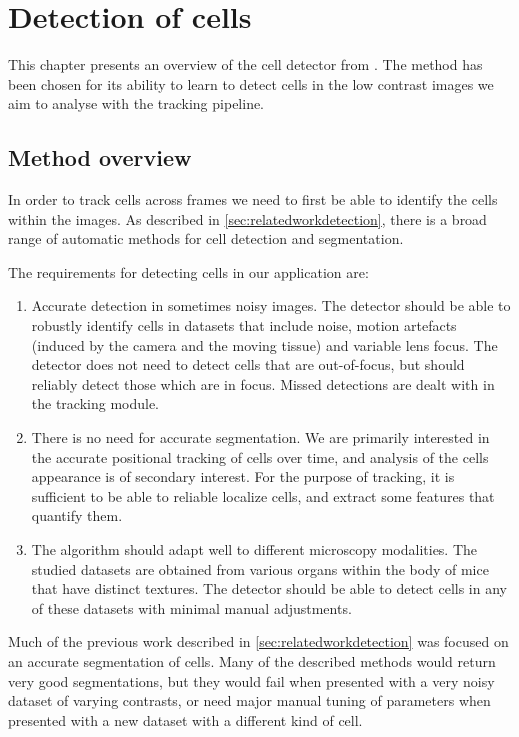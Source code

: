 \chapter{Detection of cells \statusfirstdraft}
	\label{chap:cell_detection}
	
	
	This chapter presents an overview of the cell detector from \cite{arteta12}. The method has been chosen for its ability to learn to detect cells in the low contrast images we aim to analyse with the tracking pipeline.
	
	\section{Method overview \statusfirstdraft}
	
	In order to track cells across frames we need to first be able to identify the cells within the images. As described in \cref{sec:relatedworkdetection}, there is a broad range of automatic methods for cell detection and segmentation.
	
	The requirements for detecting cells in our application are:
		
	\begin{enumerate}
	\item Accurate detection in sometimes noisy images. The detector should be able to robustly identify cells in datasets that include noise, motion artefacts (induced by the camera and the moving tissue) and variable lens focus. The detector does not need to detect cells that are out-of-focus, but should reliably detect those which are in focus. Missed detections are dealt with in the tracking module.
	
	\item There is no need for accurate segmentation. We are primarily interested in the accurate positional tracking of cells over time, and analysis of the cells appearance is of secondary interest. For the purpose of tracking, it is sufficient to be able to reliable localize cells, and extract some features that quantify them.
	
	\item The algorithm should adapt well to different microscopy modalities. The studied datasets are obtained from various organs within the body of mice that have distinct textures. The detector should be able to detect cells in any of these datasets with minimal  manual adjustments.
	\end{enumerate}
	
	Much of the previous work described in \cref{sec:relatedworkdetection} was focused on an accurate segmentation of cells. Many of the described methods would return very good segmentations, but they would fail when presented with a very noisy dataset of varying contrasts, or need major manual tuning of parameters when presented with a new dataset with a different kind of cell.
	
